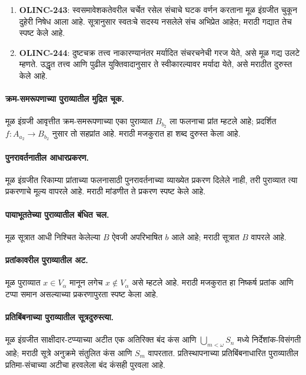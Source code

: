 \begin{enumerate}
\item \textbf{OLINC-243}: स्वसमावेशकतेवरील चर्चेत
रसेल संचाचे घटक वर्णन करताना मूळ इंग्रजीत
चुकून दुहेरी निषेध आला आहे. सूत्रानुसार
स्वतःचे सदस्य नसलेले संच अभिप्रेत आहेत;
मराठी गद्यात तेच स्पष्ट केले आहे.
\item \textbf{OLINC-244}: दुष्टचक्र तत्त्व
नाकारण्यानंतर मर्यादित संचरचनेची गरज येते,
असे मूळ गद्य उलटे म्हणते. उद्धृत तत्त्व
आणि पुढील युक्तिवादानुसार ते स्वीकारल्यावर
मर्यादा येते, असे मराठीत दुरुस्त केले आहे.
\end{enumerate}


\paragraph{क्रम-समरूपणाच्या पुराव्यातील मुद्रित चूक.} मूळ इंग्रजी आवृत्तीत क्रम-समरूपणाच्या एका पुराव्यात $B_{b_2}$ ला फलनाचा प्रांत म्हटले आहे; प्रदर्शित $f:A_{a_2}\to B_{b_2}$ नुसार तो सहप्रांत आहे. मराठी मजकुरात हा शब्द दुरुस्त केला आहे.

\paragraph{पुनरावर्तनातील आधारप्रकरण.} मूळ इंग्रजीत रिकाम्या प्रांताच्या फलनासाठी पुनरावर्तनाच्या व्याख्येत प्रकरण दिलेले नाही, तरी पुराव्यात त्या प्रकरणाचे मूल्य वापरले आहे. मराठी मांडणीत ते प्रकरण स्पष्ट केले आहे.
\paragraph{पायाभूततेच्या पुराव्यातील बंधित चल.} मूळ सूत्रात आधी निश्चित केलेल्या $B$ ऐवजी अपरिभाषित $b$ आले आहे; मराठी सूत्रात $B$ वापरले आहे.
\paragraph{प्रतांकावरील पुराव्यातील अट.} मूळ पुराव्यात $x\in V_\alpha$ मानून लगेच $x\notin V_\alpha$ असे म्हटले आहे. मराठी मजकुरात हा निष्कर्ष प्रतांक आणि टप्पा समान असल्याच्या प्रकरणापुरता स्पष्ट केला आहे.

\paragraph{प्रतिबिंबनाच्या पुराव्यातील सूत्रदुरुस्त्या.} मूळ इंग्रजीत साक्षीदार-टप्प्याच्या अटीत एक अतिरिक्त बंद कंस आणि $\bigcup_{m<\omega}S_n$ मध्ये निर्देशांक-विसंगती आहे; मराठी सूत्रे अनुक्रमे संतुलित कंस आणि $S_m$ वापरतात. प्रतिस्थापनाच्या प्रतिबिंबनाधारित पुराव्यातील प्रतिमा-संचाच्या अटीचा हरवलेला बंद कंसही पुरवला आहे.
